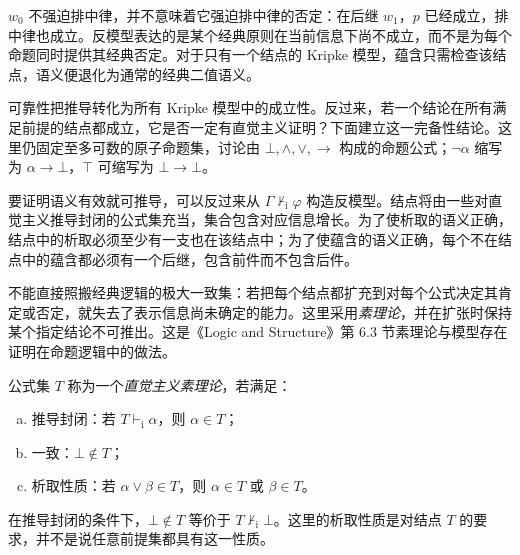 \documentclass[lang=cn,a4paper,fontset=none,zihao=false,10pt,openany,twoside]{beautybook}
\numberwithin{algorithm}{chapter}
\begin{document}
\begin{readingmaterial}[title={阅读材料：Kripke 语义},title after break={阅读材料：Kripke 语义（续）}]
\begin{remark}
$w_0$ 不强迫排中律，并不意味着它强迫排中律的否定：在后继 $w_1$，$p$ 已经成立，排中律也成立。反模型表达的是某个经典原则在当前信息下尚不成立，而不是为每个命题同时提供其经典否定。对于只有一个结点的 Kripke 模型，蕴含只需检查该结点，语义便退化为通常的经典二值语义。
\end{remark}

可靠性把推导转化为所有 Kripke 模型中的成立性。反过来，若一个结论在所有满足前提的结点都成立，它是否一定有直觉主义证明？下面建立这一完备性结论。这里仍固定至多可数的原子命题集，讨论由 $\bot,\wedge,\vee,\to$ 构成的命题公式；$\neg\alpha$ 缩写为 $\alpha\to\bot$，$\top$ 可缩写为 $\bot\to\bot$。

\begin{remark}[完备性证明的思路]
要证明语义有效就可推导，可以反过来从 $\Gamma\nvdash_{\mathrm i}\varphi$ 构造反模型。结点将由一些对直觉主义推导封闭的公式集充当，集合包含对应信息增长。为了使析取的语义正确，结点中的析取必须至少有一支也在该结点中；为了使蕴含的语义正确，每个不在结点中的蕴含都必须有一个后继，包含前件而不包含后件。

不能直接照搬经典逻辑的极大一致集：若把每个结点都扩充到对每个公式决定其肯定或否定，就失去了表示信息尚未确定的能力。这里采用\emph{素理论}，并在扩张时保持某个指定结论不可推出。这是《Logic and Structure》第 6.3 节素理论与模型存在证明在命题逻辑中的做法。
\end{remark}

\begin{definition}[直觉主义素理论]
公式集 $T$ 称为一个\emph{直觉主义素理论}，若满足：
\begin{enumerate}[(a)]
\item 推导封闭：若 $T\vdash_{\mathrm i}\alpha$，则 $\alpha\in T$；
\item 一致：$\bot\notin T$；
\item 析取性质：若 $\alpha\vee\beta\in T$，则 $\alpha\in T$ 或 $\beta\in T$。
\end{enumerate}
\end{definition}
在推导封闭的条件下，$\bot\notin T$ 等价于 $T\nvdash_{\mathrm i}\bot$。这里的析取性质是对结点 $T$ 的要求，并不是说任意前提集都具有这一性质。


\end{readingmaterial}
\end{document}
